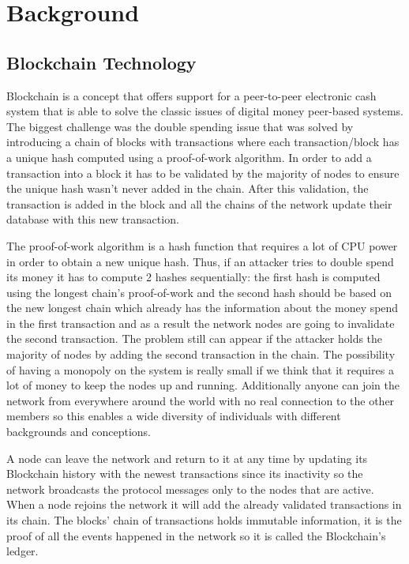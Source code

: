 \chapter{Background}
\label{chapter:chapter1}

\section{Blockchain Technology}
\label{sec:chapter1-section1}

Blockchain is a concept that offers support for a peer-to-peer electronic cash system that is able to solve the classic issues of digital money peer-based systems. The biggest challenge was the double spending issue that was solved by introducing a chain of blocks with transactions where each transaction/block has a unique hash computed using a proof-of-work algorithm. In order to add a transaction into a block it has to be validated by the majority of nodes to ensure the unique hash wasn't never added in the chain. After this validation, the transaction is added in the block and all the chains of the network update their database with this new transaction. 

The proof-of-work algorithm is a hash function that requires a lot of CPU power in order to obtain a new unique hash. Thus, if an attacker tries to double spend its money it has to compute 2 hashes sequentially: the first hash is computed using the longest chain's proof-of-work and the second hash should be based on the new longest chain which already has the information about the money spend in the first transaction and as a result the network nodes are going to invalidate the second transaction. The problem still can appear if the attacker holds the majority of nodes by adding the second transaction in the chain. The possibility of having a monopoly on the system is really small if we think that it requires a lot of money to keep the nodes up and running. Additionally anyone can join the network from everywhere around the world with no real connection to the other members so this enables a wide diversity of individuals with different backgrounds and conceptions.

A node can leave the network and return to it at any time by updating its Blockchain history with the newest transactions since its inactivity so the network broadcasts the protocol messages only to the nodes that are active. When a node rejoins the network it will add the already validated transactions in its chain. The blocks' chain of transactions holds immutable information, it is the proof of all the events happened in the network so it is called the Blockchain's ledger.


